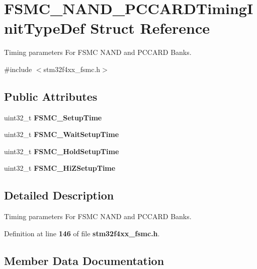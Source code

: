 \section{F\+S\+M\+C\+\_\+\+N\+A\+N\+D\+\_\+\+P\+C\+C\+A\+R\+D\+Timing\+Init\+Type\+Def Struct Reference}
\label{structFSMC__NAND__PCCARDTimingInitTypeDef}


Timing parameters For F\+S\+MC N\+A\+ND and P\+C\+C\+A\+RD Banks.  




{\ttfamily \#include $<$stm32f4xx\+\_\+fsmc.\+h$>$}

\subsection*{Public Attributes}
\begin{DoxyCompactItemize}
\item 
uint32\+\_\+t \textbf{ F\+S\+M\+C\+\_\+\+Setup\+Time}
\item 
uint32\+\_\+t \textbf{ F\+S\+M\+C\+\_\+\+Wait\+Setup\+Time}
\item 
uint32\+\_\+t \textbf{ F\+S\+M\+C\+\_\+\+Hold\+Setup\+Time}
\item 
uint32\+\_\+t \textbf{ F\+S\+M\+C\+\_\+\+Hi\+Z\+Setup\+Time}
\end{DoxyCompactItemize}


\subsection{Detailed Description}
Timing parameters For F\+S\+MC N\+A\+ND and P\+C\+C\+A\+RD Banks. 

Definition at line \textbf{ 146} of file \textbf{ stm32f4xx\+\_\+fsmc.\+h}.



\subsection{Member Data Documentation}
\mbox{\label{structFSMC__NAND__PCCARDTimingInitTypeDef_ae39ab3cbe94c85c5614018cd0fc40094}} 
